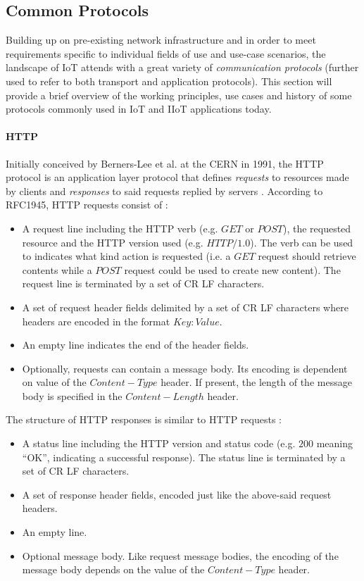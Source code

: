 \subsection{Common Protocols}
\label{sec:iot-common-protocols}
Building up on pre-existing network infrastructure and in order to meet requirements specific to individual fields of use and use-case scenarios, the landscape of \ac{IoT} attends with a great variety of \emph{communication protocols} (further used to refer to both transport and application protocols). This section will provide a brief overview of the working principles, use cases and history of some protocols commonly used in \ac{IoT} and \ac{IIoT} applications today.
\paragraph{\ac{HTTP}}
Initially conceived by Berners-Lee et al. at the \ac{CERN} in 1991, the \ac{HTTP} protocol is an application layer protocol that defines \emph{requests} to resources made by clients and \emph{responses} to said requests replied by servers \cite{http1991}. According to RFC1945, \ac{HTTP} requests consist of \cite{rfc1945}:
\begin{itemize}
    \item A request line including the \ac{HTTP} verb (e.g. $GET$ or $POST$), the requested resource and the \ac{HTTP} version used (e.g. $HTTP/1.0$). The verb can be used to indicates what kind action is requested (i.e. a $GET$ request should retrieve contents while a $POST$ request could be used to create new content). The request line is terminated by a set of \ac{CR} \ac{LF} characters.
    \item A set of request header fields delimited by a set of \ac{CR} \ac{LF} characters where headers are encoded in the format $Key: Value$.
    \item An empty line indicates the end of the header fields.
    \item Optionally, requests can contain a message body. Its encoding is dependent on value of the $Content-Type$ header. If present, the length of the message body is specified in the $Content-Length$ header.
\end{itemize}
The structure of \ac{HTTP} responses is similar to \ac{HTTP} requests \cite{rfc1945}:
\begin{itemize}
    \item A status line including the \ac{HTTP} version and status code (e.g. $200$ meaning \enquote{OK}, indicating a successful response). The status line is terminated by a set of \ac{CR} \ac{LF} characters.
    \item A set of response header fields, encoded just like the above-said request headers.
    \item An empty line.
    \item Optional message body. Like request message bodies, the encoding of the message body depends on the value of the $Content-Type$ header.
\end{itemize}
